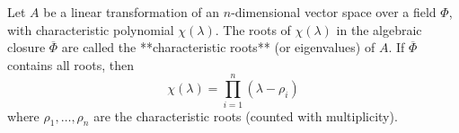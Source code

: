 Let $A$ be a linear transformation of an $n$-dimensional vector space over a field $\Phi$, with characteristic polynomial $\chi(\lambda)$. The roots of $\chi(\lambda)$ in the algebraic closure $\overline{\Phi}$ are called the **characteristic roots** (or eigenvalues) of $A$. If $\overline{\Phi}$ contains all roots, then
$$\chi(\lambda) = \prod_{i=1}^{n} (\lambda - \rho_i)$$
where $\rho_1, \ldots, \rho_n$ are the characteristic roots (counted with multiplicity).
